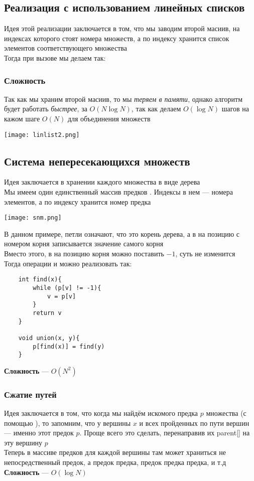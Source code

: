 \documentclass[a4paper]{article}
\begin{document}
\subsection{Реализация с использованием линейных списков}
Идея этой реализации заключается в том, что мы заводим второй масиив, на индексах которого стоят номера множеств, а по индексу хранится список элементов соответствующего множества\\[2mm]
\indent Тогда при вызове  мы делаем так: 
\subsubsection*{Сложность}
Так как мы храним второй масиив, то мы \textit{теряем в памяти}, однако алгоритм будет работать \textit{быстрее}, за $O(N\log N)$, так как делаем $O(\log N)$ шагов на кажом шаге $O(N)$ для объединения множеств
\begin{center}
    \texttt{[image: linlist2.png]}
    \label{union-find-lin}
\end{center}

\subsection{Система непересекающихся множеств}
Идея заключается в хранении каждого множества в виде дерева\\[2mm]
\indent Мы имеем один единственный массив предков . Индексы в нем — номера элементов, а по индексу хранится номер предка
\begin{center}
    \texttt{[image: snm.png]}
    \label{dsu}
\end{center}
В данном примере, петли означают, что это корень дерева, а в  на позицию с номером корня записывается значение самого корня\\[2mm]
Вместо этого, в  на позицию корня можно поставить $-1$, суть не изменится\\[2mm]
Тогда операции  и  можно реализовать так:
\begin{lstlisting}
    int find(x){
        while (p[v] != -1){
            v = p[v]
        }
        return v
    }
    
    void union(x, y){
        p[find(x)] = find(y)
    }
\end{lstlisting}
\indent\textbf{Сложность} — $O(N^2)$
\subsubsection{Сжатие путей}
Идея заключается в том, что когда мы найдём искомого предка $p$ множества (с помощью ), то запомним, что у вершины $x$ и всех пройденных по пути вершин — именно этот предок $p$. Проще всего это сделать, перенаправив их {\rm parent}[] на эту вершину $p$\\[2mm]
\indent Теперь в массиве предков для каждой вершины там может храниться не непосредственный предок, а предок предка, предок предка предка, и т.д\\[2mm]
\indent \textbf{Сложность} — $O(\log N)$
\end{document}
